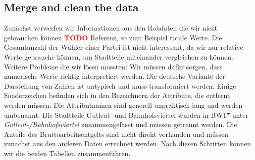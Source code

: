 \documentclass[a4paper,10pt]{scrartcl}
\newcommand{\TODO}{\textcolor{red}{\textbf{TODO }}}
\begin{document}
\subsection{Merge and clean the data}
Zunächst verwerfen wir Informationen aus den Rohdaten die wir nicht gebrauchen können \TODO{Referenz}, so zum Beispiel totale Werte. Die Gesamtanzahl der Wähler einer Partei ist nicht interessant, da wir nur relative Werte gebrauche können, um Stadtteile miteinander vergleichen zu können. Weitere Probleme die wir lösen mussten: Wir müssen dafür sorgen, dass numerische Werte richtig interpretiert werden. Die deutsche Variante der Darstellung von Zahlen ist untypisch und muss transformiert werden. Einige Sonderzeichen befinden sich in den Bezeichnern der Attribute, die entfernt werden müssen. Die Attributnamen sind generell unpraktisch lang und werden umbenannt. Die Stadtteile Gutleut- und Bahnhofsviertel wurden in BW17 unter \emph{Gutleut-/Bahnhofsviertel} zusammengefasst und müssen getrennt werden. Die Anteile des Bruttoarbeitsentgelts sind nicht direkt vorhanden und müssen zunächst aus den anderen Daten errechnet werden.
Nach diesen Schritten können wir die beiden Tabellen zusammenführen.
\end{document}
